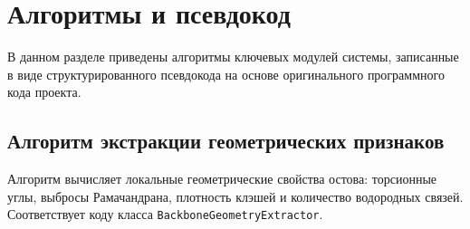 \documentclass[12pt, a4paper]{article}
\begin{document}
\section{Алгоритмы и псевдокод}

В данном разделе приведены алгоритмы ключевых модулей системы, записанные в виде структурированного псевдокода на основе оригинального программного кода проекта.

\subsection{Алгоритм экстракции геометрических признаков}
Алгоритм вычисляет локальные геометрические свойства остова: торсионные углы, выбросы Рамачандрана, плотность клэшей и количество водородных связей. Соответствует коду класса \texttt{BackboneGeometryExtractor}.
\end{document}
